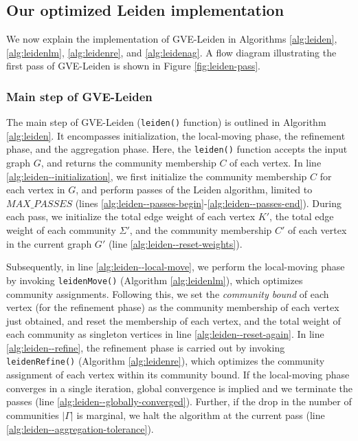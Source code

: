 







\subsection{Our optimized Leiden implementation}

We now explain the implementation of GVE-Leiden in Algorithms \ref{alg:leiden}, \ref{alg:leidenlm}, \ref{alg:leidenre}, and \ref{alg:leidenag}. A flow diagram illustrating the first pass of GVE-Leiden is shown in Figure \ref{fig:leiden-pass}.


\subsubsection{Main step of GVE-Leiden}

The main step of GVE-Leiden (\texttt{leiden()} function) is outlined in Algorithm \ref{alg:leiden}. It encompasses initialization, the local-moving phase, the refinement phase, and the aggregation phase. Here, the \texttt{leiden()} function accepts the input graph $G$, and returns the community membership $C$ of each vertex. In line \ref{alg:leiden--initialization}, we first initialize the community membership $C$ for each vertex in $G$, and perform passes of the Leiden algorithm, limited to $MAX\_PASSES$ (lines \ref{alg:leiden--passes-begin}-\ref{alg:leiden--passes-end}). During each pass, we initialize the total edge weight of each vertex $K'$, the total edge weight of each community $\Sigma'$, and the community membership $C'$ of each vertex in the current graph $G'$ (line \ref{alg:leiden--reset-weights}).

Subsequently, in line \ref{alg:leiden--local-move}, we perform the local-moving phase by invoking \texttt{leidenMove()} (Algorithm \ref{alg:leidenlm}), which optimizes community assignments. Following this, we set the \textit{community bound} of each vertex (for the refinement phase) as the community membership of each vertex just obtained, and reset the membership of each vertex, and the total weight of each community as singleton vertices in line \ref{alg:leiden--reset-again}. In line \ref{alg:leiden--refine}, the refinement phase is carried out by invoking \texttt{leidenRefine()} (Algorithm \ref{alg:leidenre}), which optimizes the community assignment of each vertex within its community bound. If the local-moving phase converges in a single iteration, global convergence is implied and we terminate the passes (line \ref{alg:leiden--globally-converged}). Further, if the drop in the number of communities $|\Gamma|$ is marginal, we halt the algorithm at the current pass (line \ref{alg:leiden--aggregation-tolerance}).


